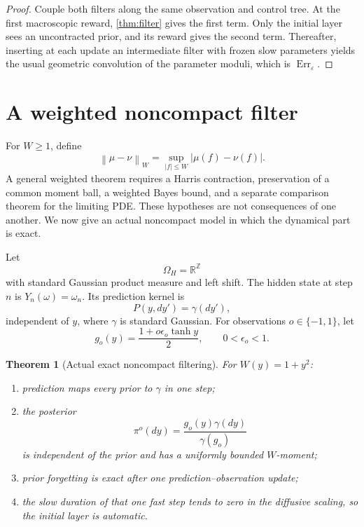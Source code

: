 \documentclass[11pt,reqno]{amsart}
\newtheorem{theorem}{Theorem}[section]
\theoremstyle{definition}
\theoremstyle{remark}
\newcommand{\R}{\mathbb R}
\newcommand{\norm}[1]{\left\lVert #1\right\rVert}
\newcommand{\abs}[1]{\left\lvert #1\right\rvert}
\begin{document}
\begin{proof}
Couple both filters along the same observation and control tree.  At the first
macroscopic reward, \cref{thm:filter} gives the first term.  Only the initial
layer sees an uncontracted prior, and its reward gives the second term.
Thereafter, inserting at each update an intermediate filter with frozen slow
parameters yields the usual geometric convolution of the parameter moduli,
which is $\operatorname{Err}_\varepsilon$.
\end{proof}

\section{A weighted noncompact filter}\label{sec:weighted}

For $W\ge1$, define
\[
 \norm{\mu-\nu}_W=\sup_{\abs f\le W}\abs{\mu(f)-\nu(f)}.
\]
A general weighted theorem requires a Harris contraction, preservation of a
common moment ball, a weighted Bayes bound, and a separate comparison theorem
for the limiting PDE.  These hypotheses are not consequences of one another.
We now give an actual noncompact model in which the dynamical part is exact.

Let
\[
 \Omega_H=\R^{\mathbb Z}
\]
with standard Gaussian product measure and left shift.  The hidden state at
step $n$ is $Y_n(\omega)=\omega_n$.  Its prediction kernel is
\[
 P(y,dy')=\gamma(dy'),
\]
independent of $y$, where $\gamma$ is standard Gaussian.  For observations
$o\in\{-1,1\}$, let
\begin{equation}\label{eq:obs}
 g_o(y)=\frac{1+o\epsilon_o\tanh y}{2},
 \qquad 0<\epsilon_o<1.
\end{equation}

\begin{theorem}[Actual exact noncompact filtering]\label{thm:gaussian-filter}
For $W(y)=1+y^2$:
\begin{enumerate}[label=(\roman*)]
\item prediction maps every prior to $\gamma$ in one step;
\item the posterior
\[
 \pi^o(dy)=\frac{g_o(y)\gamma(dy)}{\gamma(g_o)}
\]
is independent of the prior and has a uniformly bounded $W$-moment;
\item prior forgetting is exact after one prediction--observation update;
\item the slow duration of that one fast step tends to zero in the diffusive
scaling, so the initial layer is automatic.
\end{enumerate}
\end{theorem}
\end{document}
